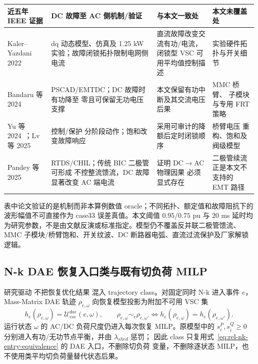 \begin{center}\footnotesize
\begin{tabular}{@{}p{3.0cm}p{4.2cm}p{3.3cm}p{3.2cm}@{}}
\toprule
\textbf{近五年 IEEE 证据} & \textbf{DC 故障至 AC 侧机制/验证} &
\textbf{与本文一致处} & \textbf{本文未覆盖处}\\
\midrule
Kaler--Yazdani 2022~\cite{relpf:kaler2022} & dq 动态模型、仿真及 1.25 kW
实验；故障闭锁拓扑限制电网侧电流 & 直流故障改变交流有功/电流，闭锁型 VSC
可用平均值控制描述 & 实验硬件拓扑与开关细节\\
Bandaru 等 2024~\cite{relpf:bandaru2024} & PSCAD/EMTDC；DC 故障时有功降至
零且可保留无功电压支撑 & 本文保留有功中断及其交流电压后果 & MMC 桥臂、
子模块与专用 FRT 策略\\
Yu 等 2024~\cite{relpf:yu2024}；Lv 等 2025~\cite{relpf:lv2025} & 控制/保护
分阶段动作；饱和改变故障响应 & 采用可审计的降额后定时闭锁顺序 & 桥臂电压
重构、饱和及阀级模型\\
Pandey 等 2025~\cite{relpf:pandey2025} & RTDS/CHIL；传统 BIC 二极管可形成
不控整流馈流，DC 故障显著改变 AC 端电流 & 证明 DC$\rightarrow$AC 物理因果
必须显式存在 & 二极管续流正是本文不支持的 EMT 路径\\
\bottomrule
\end{tabular}
\end{center}
表中论文验证的是机制而非本算例数值 oracle；不同拓扑、额定值和故障阻抗下的
波形幅值不可直接作为 case33 误差真值。本文阈值 $0.95/0.75$ pu 与 20 ms
延时均为研究参数，不是由文献反演或标准指定。模型仍不覆盖反并联二极管馈流、
MMC 子模块/桥臂饱和、开关纹波、DC 断路器电弧、直流过流保护及厂家解锁逻辑。

\subsection{N-k DAE 恢复入口类与既有切负荷 MILP}
\label{sec:rel-pf-nk-entry-class}
研究驱动  不把恢复优化结果
混入 trajectory class。对固定同时 N-k 进入事件 $e$，Mass-Matrix DAE 轨迹
$\rho_{e,\omega}$ 向恢复模型投影为附加不可用 VSC 集
\begin{equation}
 h_e(\rho_{e,\omega})=\mathcal U^{dae}_{vsc}(e,\omega),\qquad
 \rho_{e,\omega}\sim_e\rho_{e,\omega'}
 \Longleftrightarrow h_e(\rho_{e,\omega})=h_e(\rho_{e,\omega'}).
 \label{eq:rel-nk-entry-equivalence}
\end{equation}
运行状态 $\omega$ 的 AC/DC 负荷尺度仍进入每次恢复 MILP。原模型中的
$s_i^P,s_i^Q\ge0$ 分别进入有功/无功节点平衡，并由 $\lambda_{shed}$ 惩罚；
因此 class 只复用式~\eqref{eq:rel-nk-entry-equivalence} 的 DAE 入口，不删除切负荷
变量，不删除逐状态 MILP，也不使用类平均切负荷量替代状态后果。


